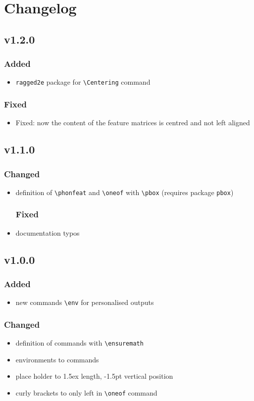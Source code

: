 \documentclass[a4paper]{article}
\begin{document}
\section{Changelog}
\subsection*{v1.2.0}
\subsubsection*{Added}
\begin{itemize}
\item \texttt{ragged2e} package for \verb+\Centering+ command
\end{itemize}
\subsubsection*{Fixed}
\begin{itemize}
\item Fixed: now the content of the feature matrices is centred and not left aligned
\end{itemize}

\subsection*{v1.1.0}
\subsubsection*{Changed}
\begin{itemize}
\item definition of \verb+\phonfeat+ and \verb+\oneof+ with \verb+\pbox+ (requires package \texttt{pbox})
\subsubsection*{Fixed}
\item documentation typos
\end{itemize}

\subsection*{v1.0.0}
\subsubsection*{Added}
\begin{itemize}
\item new commands \verb|\env| for personalised outputs
\end{itemize}

\subsubsection*{Changed}
\begin{itemize}
\item definition of commands with \verb|\ensuremath|
\item environments to commands
\item place holder to 1.5ex length, -1.5pt vertical position
\item curly brackets to only left in \verb|\oneof| command
\end{itemize}
\end{document}
